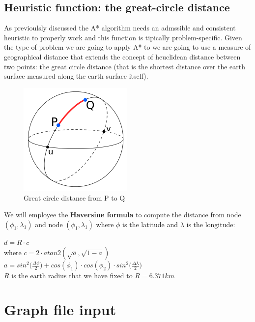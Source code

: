 \documentclass[twocolumn, switch]{article} %
\begin{document}
\subsection{Heuristic function: the great-circle distance}
As previoulsly discussed the A* algorithm needs an admssible and consistent heuristic to properly work and this
function is tipically problem-specific. Given the type of problem we are going to apply A* to we are going
to use a measure of geographical distance that extends the concept of heuclidean distance between two points:
the great circle distance (that is the shortest distance over the earth surface measured along the
earth surface itself).
\begin{figure}[ht!]
  \centering
  \includegraphics[width=0.5\linewidth]{haversine.png}
  \caption{Great circle distance from P to Q}
  \label{haversine}
\end{figure}
We will employee the \textbf{Haversine formula} to compute the distance from node $(\phi_1,\lambda_1)$
and node $(\phi_1,\lambda_1)$ where $\phi$ is the latitude and $\lambda$ is the longitude:
\begin{center}
  $d = R \cdot c$\\
  where $c = 2 \cdot atan2(\sqrt{a},\sqrt{1-a})$\\
  $a = sin^2\Big({\frac{\Delta \phi}{2}}\Big) + cos(\phi_1) \cdot cos(\phi_2) \cdot sin^2\Big({\frac{\Delta \lambda}{2}}\Big)$
  \\$R$ is the earth radius that we have fixed to $R=6.371km$
\end{center}

\section{Graph file input}
\end{document}
